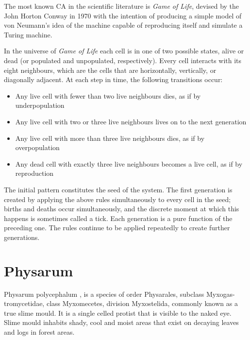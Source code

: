 \par
The most known CA in the scientific literature is \textit{Game of Life}, devised by the John Horton Conway in 1970 with the intention of producing a simple model of von Neumann's idea of the machine capable of reproducing itself and simulate a Turing machine. 

\par
In the universe of \textit{Game of Life} each cell is in one of two possible states, alive or dead (or populated and unpopulated, respectively). Every cell interacts with its eight neighbours, which are the cells that are horizontally, vertically, or diagonally adjacent. At each step in time, the following transitions occur:

\begin{itemize}
	\item Any live cell with fewer than two live neighbours dies, as if by underpopulation
	\item Any live cell with two or three live neighbours lives on to the next generation
	\item Any live cell with more than three live neighbours dies, as if by overpopulation
	\item Any dead cell with exactly three live neighbours becomes a live cell, as if by reproduction
\end{itemize}

\par
The initial pattern constitutes the seed of the system. The first generation is created by applying the above rules simultaneously to every cell in the seed; births and deaths occur simultaneously, and the discrete moment at which this happens is sometimes called a tick. Each generation is a pure function of the preceding one. The rules continue to be applied repeatedly to create further generations. 

\section{Physarum}
Physarum polycephalum \cite{sun2017physarum}, \cite{mayne2016biology} is a species of order Physarales, subclass Myxogas-tromycetidae, class Myxomecetes, division Myxostelida, commonly known as a true slime mould.
It is a single celled protist that is visible to the naked eye. Slime mould inhabits shady, cool and moist areas that exist on decaying leaves and logs in forest areas.

